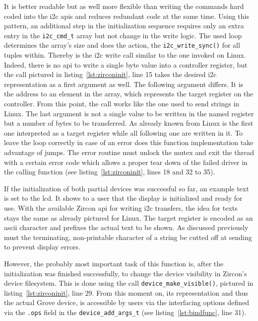 It is better readable but as well more flexible than writing the commands hard coded into the \ac{i2c} \acp{api} and reduces redundant code at the same time.
Using this pattern, an additional step in the initialization sequence requires only an extra entry in the \texttt{i2c_cmd_t} array but not change in the write logic.
The used loop determines the array's size and does the action, the \texttt{i2c_write_sync()} for all tuples within.
Thereby is the \ac{i2c} write call similar to the one invoked on Linux.
Indeed, there is no \ac{api} to write a single byte value into a controller register, but the call pictured in listing~\ref{lst:zirconinit}, line 15 takes the desired \ac{i2c} representation as a first argument as well.
The following argument differs.
It is the address to an element in the array, which represents the target register on the controller.
From this point, the call works like the one used to send strings in Linux.
The last argument is not a single value to be written in the named register but a number of bytes to be transferred.
As already known from Linux is the first one interpreted as a target register while all following one are written in it.
To leave the loop correctly in case of an error does this function implementation take advantage of jumps.
The error routine must unlock the mutex and exit the thread with a certain error code which allows a proper tear down of the failed driver in the calling function (see listing~\ref{lst:zirconinit}, lines 18 and 32 to 35).

If the initialization of both partial devices was successful so far, an example text is set to the \ac{lcd}.
It shows to a user that the display is initialized and ready for use.
With the available Zircon \ac{api} for writing \ac{i2c} transfers, the idea for texts stays the same as already pictured for Linux.
The target register is encoded as an \ac{ascii} character and prefixes the actual text to be shown.
As discussed previously must the terminating, non-printable character of a string be cutted off at sending to prevent display errors.

However, the probably most important task of this function is, after the initialization was finished successfully, to change the device visibility in Zircon's device filesystem.
This is done using the call \texttt{device_make_visible()}, pictured in listing~\ref{lst:zirconinit}, line 29.
From this moment on, its representation and thus the actual Grove device, is accessible by users via the interfacing options defined via the \texttt{.ops} field in the \texttt{device_add_args_t} (see listing~\ref{lst:bindfunc}, line 31).

